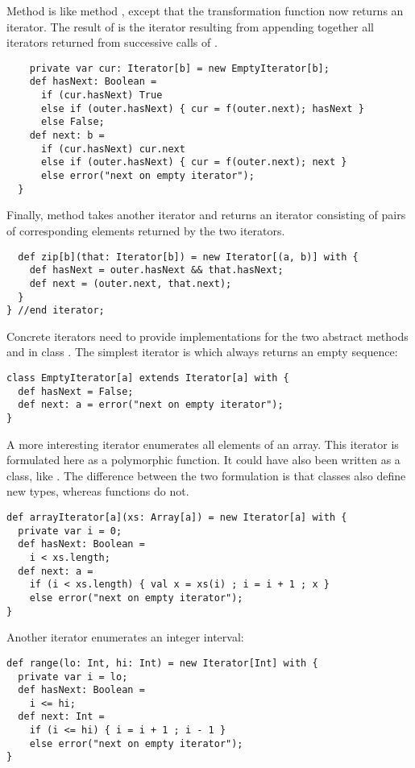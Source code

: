 \documentclass[11pt]{report}
\begin{document}
Method \verb@flatMap@ is like method \verb@map@, except that the
transformation function \verb@f@ now returns an iterator.
The result of \verb@flatMap@ is the iterator resulting from appending
together all iterators returned from successive calls of \verb@f@.
\begin{verbatim}
    private var cur: Iterator[b] = new EmptyIterator[b];
    def hasNext: Boolean =
      if (cur.hasNext) True
      else if (outer.hasNext) { cur = f(outer.next); hasNext }
      else False;
    def next: b =
      if (cur.hasNext) cur.next
      else if (outer.hasNext) { cur = f(outer.next); next }
      else error("next on empty iterator");
  }
\end{verbatim}
Finally, method \verb@zip@ takes another iterator and
returns an iterator consisting of pairs of corresponding elements
returned by the two iterators.
\begin{verbatim}
  def zip[b](that: Iterator[b]) = new Iterator[(a, b)] with {
    def hasNext = outer.hasNext && that.hasNext;
    def next = (outer.next, that.next);
  }
} //end iterator;
\end{verbatim}
Concrete iterators need to provide implementations for the two
abstract methods \verb@next@ and \verb@hasNext@ in class
\verb@Iterator@. The simplest iterator is \verb@EmptyIterator@
which always returns an empty sequence:
\begin{verbatim}
class EmptyIterator[a] extends Iterator[a] with {
  def hasNext = False;
  def next: a = error("next on empty iterator");
}
\end{verbatim}
A more interesting iterator enumerates all elements of an array.
This iterator is formulated here as a polymorphic function. It could
have also been written as a class, like \verb@EmptyIterator@. The
difference between the two formulation is that classes also define new
types, whereas functions do not.
\begin{verbatim}
def arrayIterator[a](xs: Array[a]) = new Iterator[a] with {
  private var i = 0;
  def hasNext: Boolean =
    i < xs.length;
  def next: a =
    if (i < xs.length) { val x = xs(i) ; i = i + 1 ; x }
    else error("next on empty iterator");
}
\end{verbatim}
Another iterator enumerates an integer interval:
\begin{verbatim}
def range(lo: Int, hi: Int) = new Iterator[Int] with {
  private var i = lo;
  def hasNext: Boolean =
    i <= hi;
  def next: Int =
    if (i <= hi) { i = i + 1 ; i - 1 }
    else error("next on empty iterator");
}
\end{verbatim}
\end{document}
